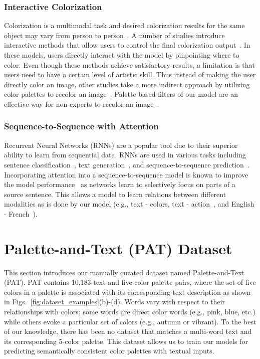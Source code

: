 \documentclass[runningheads]{llncs}
\begin{document}
\subsubsection{Interactive Colorization} 
Colorization is a multimodal task and desired colorization results for the same object may vary from person to person~\cite{charpiat2008automatic}. A number of studies introduce interactive methods that allow users to control the final colorization output~\cite{zhang2017real,li2015image}. In these models, users directly interact with the model by pinpointing where to color. Even though these methods achieve satisfactory results, a limitation is that users need to have a certain level of artistic skill. Thus instead of making the user directly color an image, other studies take a more indirect approach by utilizing color palettes to recolor an image~\cite{chang2015palette,cho2017palettenet}. Palette-based filters of our model are an effective way for non-experts to recolor an image~\cite{chang2015palette}. 

\subsubsection{Sequence-to-Sequence with Attention} Recurrent Neural Networks (RNNs) are a popular tool due to their superior ability to learn from sequential data. RNNs are used in various tasks including sentence classification~\cite{tang2015document}, text generation~\cite{sutskever2011generating}, and sequence-to-sequence prediction~\cite{sutskever2014sequence}. Incorporating attention into a sequence-to-sequence model is known to improve the model performance~\cite{luong2015effective} as networks learn to selectively focus on parts of a source sentence. This allows a model to learn relations between different modalities as is done by our model (e.g., text - colors, text - action~\cite{ahn2017text2action}, and English - French~\cite{vaswani2017attention}). 

\section{Palette-and-Text (PAT) Dataset}
\label{sec:PAT}
This section introduces our manually curated dataset named Palette-and-Text (PAT). PAT contains 10,183 text and five-color palette pairs, where the set of five colors in a palette is associated with its corresponding text description as shown in Figs.~\ref{fig:dataset_examples}(b)-(d). Words vary with respect to their relationships with colors; some words are direct color words (e.g., pink, blue, etc.) while others evoke a particular set of colors (e.g., autumn or vibrant). To the best of our knowledge, there has been no dataset that matches a multi-word text and its corresponding 5-color palette. This dataset allows us to train our models for predicting semantically consistent color palettes with textual inputs. 
\end{document}
